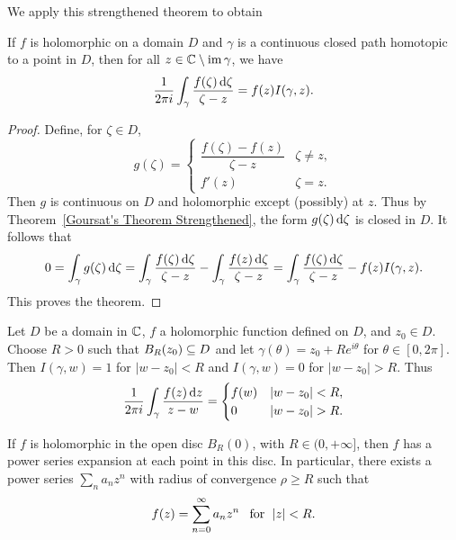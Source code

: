 We apply this strengthened theorem to obtain
\begin{theorem}
If $f$ is holomorphic on a domain $D$ and $\gamma$ is a continuous closed path homotopic to a point in $D$, then for all $z\in\mathbb{C}\setminus\mathrm{im}\,\gamma$, we have
\begin{align}\label{Cauchy integral formula}
\frac{1}{2\pi i}\int_{\gamma}\frac{f(\zeta)\mathop{}\!\mathrm{d}\zeta}{\zeta-z}=f(z)I(\gamma,z).
\end{align}
\end{theorem}
\begin{proof}
Define, for $\zeta\in D$,
\[g(\zeta)=\begin{cases}
\dfrac{f(\zeta)-f(z)}{\zeta-z}&\zeta\neq z,\\[8pt]
f'(z)&\zeta=z.
\end{cases}\]
Then $g$ is continuous on $D$ and holomorphic except (possibly) at $z$. Thus by Theorem~\ref{Goursat's Theorem Strengthened}, the form $g(\zeta)\mathop{}\!\mathrm{d}\zeta$ is closed in $D$. It follows that
\[0=\int_{\gamma}g(\zeta)\mathop{}\!\mathrm{d}\zeta=\int_{\gamma}\frac{f(\zeta)\mathop{}\!\mathrm{d}\zeta}{\zeta-z}-\int_{\gamma}\frac{f(z)\mathop{}\!\mathrm{d}\zeta}{\zeta-z}=\int_{\gamma}\frac{f(\zeta)\mathop{}\!\mathrm{d}\zeta}{\zeta-z}-f(z)I(\gamma,z).\]
This proves the theorem.
\end{proof}
\begin{example}
Let $D$ be a domain in $\mathbb{C}$, $f$ a holomorphic function defined on $D$, and $z_0\in D$. Choose $R>0$ such that $B_{R}(z_0)\subseteq D$ and let $\gamma(\theta)=z_0+Re^{i\theta}$ for $\theta\in[0,2\pi]$. Then $I(\gamma,w)=1$ for $|w-z_0|<R$ and $I(\gamma,w)=0$ for $|w-z_0|>R$. Thus
\[\frac{1}{2\pi i}\int_{\gamma}\frac{f(z)\dif z}{z-w}=\begin{cases}
f(w)&|w-z_0|<R,\\
0&|w-z_0|>R.
\end{cases}\]
\end{example}
\begin{theorem}\label{holomorphic power expansion}
If $f$ is holomorphic in the open disc $B_{R}(0)$, with $R\in(0,+\infty]$, then $f$ has a power series expansion at each point in this disc. In particular, there exists a power series $\sum_na_nz^n$ with radius of convergence $\rho\geq R$ such that
\[f(z)=\sum_{n=0}^{\infty}a_nz^n\hspace{8pt}\text{for}\hspace{6pt}|z|<R.\]
\end{theorem}
